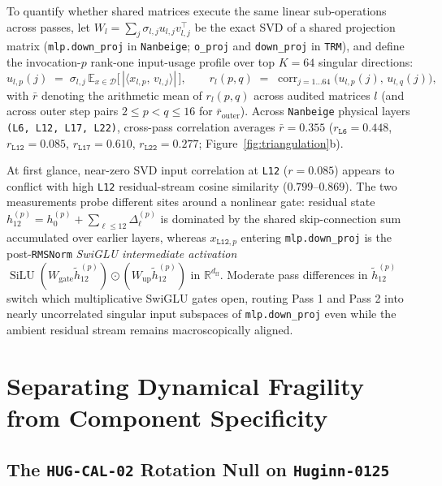 \documentclass[10pt,letterpaper]{article}
\begin{document}
To quantify whether shared matrices execute the same linear sub-operations across passes, let $W_l = \sum_{j} \sigma_{l,j} u_{l,j} v_{l,j}^\top$ be the exact SVD of a shared projection matrix (\texttt{mlp.down\_proj} in \texttt{Nanbeige}; \texttt{o\_proj} and \texttt{down\_proj} in \texttt{TRM}), and define the invocation-$p$ rank-one input-usage profile over top $K=64$ singular directions:
\begin{equation}
  u_{l,p}(j) \;=\; \sigma_{l,j}\,\mathbb{E}_{x \in \mathcal{D}}\bigl[\,|\langle x_{l,p},\, v_{l,j}\rangle|\,\bigr],
  \qquad
  r_l(p,q) \;=\; \operatorname{corr}_{j=1\dots 64}\!\bigl(u_{l,p}(j),\, u_{l,q}(j)\bigr),
  \label{eq:svd_r}
\end{equation}
with $\bar{r}$ denoting the arithmetic mean of $r_l(p,q)$ across audited matrices $l$ (and across outer step pairs $2\le p < q \le 16$ for $\bar{r}_{\mathrm{outer}}$). Across \texttt{Nanbeige} physical layers \texttt{(L6, L12, L17, L22)}, cross-pass correlation averages $\bar{r} = 0.355$ ($r_{\texttt{L6}}=0.448$, $r_{\texttt{L12}}=0.085$, $r_{\texttt{L17}}=0.610$, $r_{\texttt{L22}}=0.277$; Figure~\ref{fig:triangulation}b).

At first glance, near-zero SVD input correlation at \texttt{L12} ($r=0.085$) appears to conflict with high \texttt{L12} residual-stream cosine similarity ($0.799$--$0.869$). The two measurements probe different sites around a nonlinear gate: residual state $h_{12}^{(p)} = h_0^{(p)} + \sum_{\ell \le 12}\Delta_\ell^{(p)}$ is dominated by the shared skip-connection sum accumulated over earlier layers, whereas $x_{\texttt{L12},p}$ entering \texttt{mlp.down\_proj} is the post-\texttt{RMSNorm} \emph{SwiGLU intermediate activation} $\operatorname{SiLU}(W_{\mathrm{gate}}\tilde{h}_{12}^{(p)}) \odot (W_{\mathrm{up}}\tilde{h}_{12}^{(p)})$ in $\mathbb{R}^{d_{\mathrm{ff}}}$. Moderate pass differences in $\tilde{h}_{12}^{(p)}$ switch which multiplicative SwiGLU gates open, routing Pass 1 and Pass 2 into nearly uncorrelated singular input subspaces of \texttt{mlp.down\_proj} even while the ambient residual stream remains macroscopically aligned.

\section{Separating Dynamical Fragility from Component Specificity}\label{sec:fragility}

\subsection{The \texttt{HUG-CAL-02} Rotation Null on \texttt{Huginn-0125}}
\end{document}
